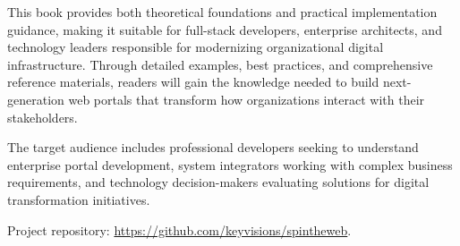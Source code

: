 This book provides both theoretical foundations and practical implementation guidance, making it suitable for full-stack developers, enterprise architects, and technology leaders responsible for modernizing organizational digital infrastructure. Through detailed examples, best practices, and comprehensive reference materials, readers will gain the knowledge needed to build next-generation web portals that transform how organizations interact with their stakeholders.

The target audience includes professional developers seeking to understand enterprise portal development, system integrators working with complex business requirements, and technology decision-makers evaluating solutions for digital transformation initiatives.

Project repository: \url{https://github.com/keyvisions/spintheweb}.

\clearpage
